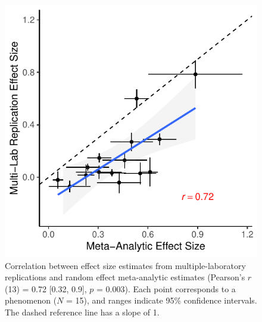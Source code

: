 \documentclass[12pt]{article}
\begin{document}
\pagebreak

\begin{figure}[h!]
\centering
     \includegraphics[width=5in]{../results/analysis_1/fig1a.pdf}
      \caption{  Correlation between effect size estimates from multiple-laboratory replications and random effect meta-analytic estimates (Pearson’s $r$(13) = 0.72 [0.32, 0.9], $p$ = 0.003). Each point corresponds to a phenomenon ($N$ = 15), and ranges indicate 95\% confidence intervals. The dashed reference line has a slope of 1. }
\end{figure}
\end{document}

